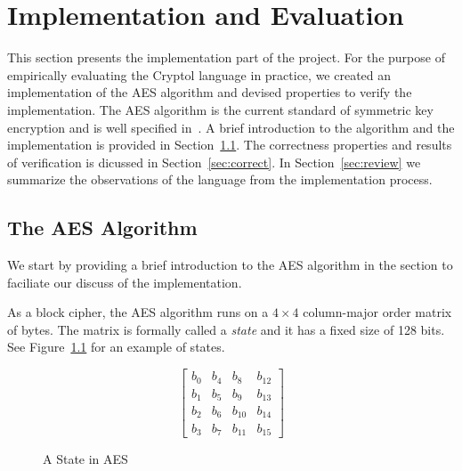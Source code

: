 \documentclass[a4paper, notitlepage]{report}
\begin{document}
\newpage

\chapter{Implementation and Evaluation}
\label{chap:implementation}

This section presents the implementation part of the project. For the purpose of
empirically evaluating the Cryptol language in practice, we created an implementation
of the AES algorithm and devised properties to verify the implementation.
The AES algorithm is the current standard of symmetric key
encryption and is well specified in~\cite{standard2001announcing}. A brief introduction
to the algorithm and the implementation is provided in Section~\ref{sec:aes}.
The correctness properties and results of verification is dicussed in
Section~\ref{sec:correct}. In Section~\ref{sec:review} we summarize the observations
of the language from the implementation process. 

\section{The AES Algorithm}
\label{sec:aes}

We start by providing a brief introduction to the AES algorithm in the section
to faciliate our discuss of the implementation.

As a block cipher, the AES
algorithm runs on a $4 \times 4$ column-major order matrix of bytes.
The matrix is formally called a \emph{state} and it has a fixed size of 128 bits.
See Figure~\ref{fig:state} for an example of states.

\begin{figure}
  \begin{center}
    \begin{equation}
      \begin{bmatrix}
        b_0 & b_4 & b_8 & b_{12} \\
        b_1 & b_5 & b_9 & b_{13} \\
        b_2 & b_6 & b_{10} & b_{14} \\
        b_3 & b_7 & b_{11} & b_{15} 
      \end{bmatrix}
    \end{equation}
  \end{center}
  \caption{A State in AES}
  \label{fig:state}
\end{figure}
\end{document}
